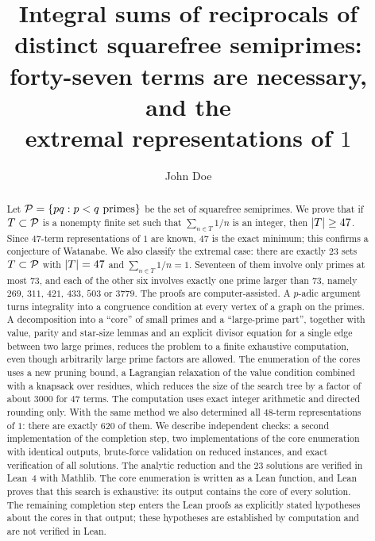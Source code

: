\documentclass[11pt]{article}
\title{Integral sums of reciprocals of distinct squarefree semiprimes:\\
forty-seven terms are necessary, and the\\ extremal representations of $1$}
\author{John Doe}
\date{}
\begin{document}
\maketitle

\begin{abstract}
Let $\mathcal{P}=\{pq: p<q \text{ primes}\}$ be the set of squarefree semiprimes.
We prove that if $T\subset\mathcal{P}$ is a nonempty finite set such that $\sum_{n\in T}1/n$ is an integer, then $\lvert T\rvert\ge 47$.
Since $47$-term representations of $1$ are known, $47$ is the exact minimum; this confirms a conjecture of Watanabe.
We also classify the extremal case: there are exactly $23$ sets $T\subset\mathcal{P}$ with $\lvert T\rvert=47$ and $\sum_{n\in T}1/n=1$.
Seventeen of them involve only primes at most $73$, and each of the other six involves exactly one prime larger than $73$, namely $269$, $311$, $421$, $433$, $503$ or $3779$.
The proofs are computer-assisted.
A $p$-adic argument turns integrality into a congruence condition at every vertex of a graph on the primes.
A decomposition into a ``core'' of small primes and a ``large-prime part'', together with value, parity and star-size lemmas and an explicit divisor equation for a single edge between two large primes, reduces the problem to a finite exhaustive computation, even though arbitrarily large prime factors are allowed.
The enumeration of the cores uses a new pruning bound, a Lagrangian relaxation of the value condition combined with a knapsack over residues, which reduces the size of the search tree by a factor of about $3000$ for $47$ terms.
The computation uses exact integer arithmetic and directed rounding only.
With the same method we also determined all $48$-term representations of $1$: there are exactly $620$ of them.
We describe independent checks: a second implementation of the completion step, two implementations of the core enumeration with identical outputs, brute-force validation on reduced instances, and exact verification of all solutions.
The analytic reduction and the $23$ solutions are verified in Lean~4 with Mathlib. The core enumeration is written as a Lean function, and Lean proves that this search is exhaustive: its output contains the core of every solution.
The remaining completion step enters the Lean proofs as explicitly stated hypotheses about the cores in that output; these hypotheses are established by computation and are not verified in Lean.
\end{abstract}

\tableofcontents

\end{document}
